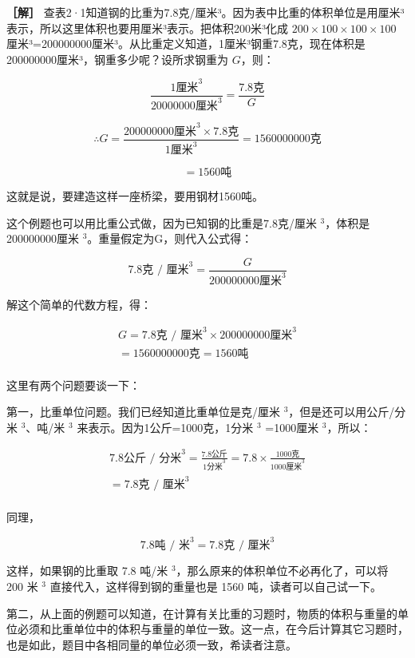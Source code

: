 \textbf{［解］}
查表2·1知道钢的比重为7.8克/厘米³。因为表中比重的体积单位是用厘米³表示，所以这里体积也要用厘米³表示。把体积200米³化成
\(200\times100\times100\times100\)
厘米³=200000000厘米³。从比重定义知道，1厘米³钢重7.8克，现在体积是200000000厘米³，钢重多少呢？设所求钢重为
\(G\)，则：

\[
\frac {1 \text{厘米} ^ {3}}{20000000 \text{厘米} ^ {3}} = \frac {7.8 \text{克}}{G}
\]

\[
\therefore G = \frac {200000000 \text{厘米} ^ {3} \times 7.8 \text{克}}{1 \text{厘米} ^ {3}} = 1560000000 \text{克}
\]

\[
= 1560 \text{吨}
\]

这就是说，要建造这样一座桥梁，要用钢材1560吨。

这个例题也可以用比重公式做，因为已知钢的比重是7.8克/厘米
\(^{3}\)，体积是200000000厘米 \(^{3}\)。重量假定为G，则代入公式得：

\[
7.8 \text{克 / 厘米} ^ {3} = \frac {G}{200000000 \text{厘米} ^ {3}}
\]

解这个简单的代数方程，得：

\[
\begin{array}{l} G = 7.8 \text{克 / 厘米} ^ {3} \times 200000000 \text{厘米} ^ {3} \\ = 1560000000 \text{克} = 1560 \text{吨} \\ \end{array}
\]

这里有两个问题要谈一下：

第一，比重单位问题。我们已经知道比重单位是克/厘米
\(^{3}\)，但是还可以用公斤/分米 \(^{3}\)、吨/米 \(^{3}\)
来表示。因为1公斤=1000克，1分米 \(^{3}\) =1000厘米 \(^{3}\)，所以：

\[
\begin{array}{l} 7.8 \text{公斤 / 分米} ^ {3} = \frac {7.8 \text{公斤}}{1 \text{分米} ^ {3}} = 7.8 \times \frac {1000 \text{克}}{1000 \text{厘米} ^ {3}} \\ = 7.8 \text{克 / 厘米} ^ {3} \\ \end{array}
\]

同理，

\[
7.8 \text{吨 / 米} ^ {3} = 7.8 \text{克 / 厘米} ^ {3}
\]

这样，如果钢的比重取 7.8 吨/米
\(^{3}\)，那么原来的体积单位不必再化了，可以将 200 米 \(^{3}\)
直接代入，这样得到钢的重量也是 1560 吨，读者可以自己试一下。

第二，从上面的例题可以知道，在计算有关比重的习题时，物质的体积与重量的单位必须和比重单位中的体积与重量的单位一致。这一点，在今后计算其它习题时，也是如此，题目中各相同量的单位必须一致，希读者注意。


